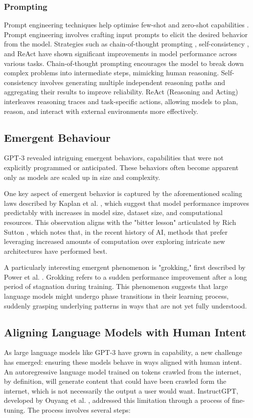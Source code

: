 \documentclass[a4paper, oneside]{discothesis}
\begin{document}
\subsubsection{Prompting}

Prompt engineering techniques help optimise few-shot and zero-shot capabilities \cite{liu2021pre}. 
Prompt engineering involves crafting input prompts to elicit the desired behavior from the model. 
Strategies such as chain-of-thought prompting \cite{wei2022chain}, self-consistency \cite{wang2022self}, and ReAct \cite{yao2023react} have shown significant improvements in model performance across various tasks. Chain-of-thought prompting encourages the model to break down complex problems into intermediate steps, mimicking human reasoning. Self-consistency involves generating multiple independent reasoning paths and aggregating their results to improve reliability. ReAct (Reasoning and Acting) interleaves reasoning traces and task-specific actions, allowing models to plan, reason, and interact with external environments more effectively.

\subsection{Emergent Behaviour}
GPT-3 revealed intriguing emergent behaviors, capabilities that were not explicitly programmed or anticipated. These behaviors often become apparent only as models are scaled up in size and complexity.

One key aspect of emergent behavior is captured by the aforementioned scaling laws described by Kaplan et al. \cite{kaplan2020scaling}, which suggest that model performance improves predictably with increases in model size, dataset size, and computational resources. This observation aligns with the "bitter lesson" articulated by Rich Sutton \cite{sutton2019bitter}, which notes that, in the recent history of AI, methods that prefer leveraging increased amounts of computation over exploring intricate new architectures have performed best.

A particularly interesting emergent phenomenon is "grokking," first described by Power et al. \cite{power2022grokking}. Grokking refers to a sudden performance improvement after a long period of stagnation during training. This phenomenon suggests that large language models might undergo phase transitions in their learning process, suddenly grasping underlying patterns in ways that are not yet fully understood.

\subsection{Aligning Language Models with Human Intent}
As large language models like GPT-3 have grown in capability, a new challenge has emerged: ensuring these models behave in ways aligned with human intent. An autoregressive language model trained on tokens crawled from the internet, by definition, will generate content that could have been crawled form the internet, which is not necessarily the output a user would want. InstructGPT, developed by Ouyang et al. \cite{ouyang2022training}, addressed this limitation through a process of fine-tuning.
The process involves several steps:
\end{document}
